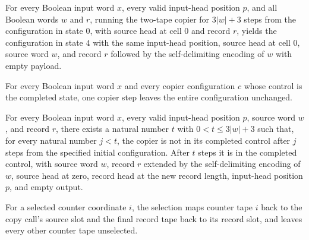 \begin{lemma}
\label{Complexity.clCopy_run}
\leanok
{}
For every Boolean input word $x$, every valid input-head position $p$, and all Boolean
words $w$ and $r$, running the two-tape copier for $3|w|+3$ steps from the configuration
in state $0$, with source head at cell $0$ and record $r$, yields the configuration in
state $4$ with the same input-head position, source head at cell $0$, source word $w$,
and record $r$ followed by the self-delimiting encoding of $w$ with empty payload.
\end{lemma}

\begin{lemma}
\label{Complexity.clCopy_idle}
\leanok
{}
For every Boolean input word $x$ and every copier configuration $c$ whose control is the
completed state, one copier step leaves the entire configuration unchanged.
\end{lemma}

\begin{lemma}
\label{Complexity.clCopy_first}
\leanok
{}
For every Boolean input word $x$, every valid input-head position $p$, source word $w$,
and record $r$, there exists a natural number $t$ with $0<t\le 3|w|+3$ such that, for
every natural number $j<t$, the copier is not in its completed control after $j$ steps
from the specified initial configuration. After $t$ steps it is in the completed
control, with source word $w$, record $r$ extended by the self-delimiting encoding of
$w$, source head at zero, record head at the new record length, input-head position $p$,
and empty output.
\end{lemma}

\begin{definition}
\label{Complexity.clRowSelect}
\leanok
{}
For a selected counter coordinate $i$, the selection maps counter tape $i$ back to the copy call's source slot and the final record tape back to its record slot, and leaves every other counter tape unselected.
\end{definition}

